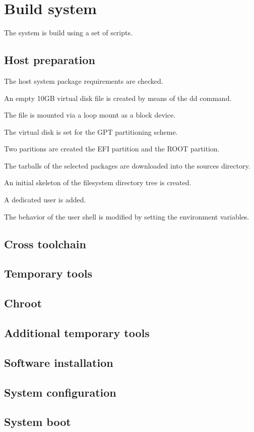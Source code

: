 \section{Build system}\label{Build system}

The system is build using a set of scripts.

\subsection{Host preparation}

The host system package requirements are checked.

An empty 10GB virtual disk file is created by means of the dd command.

The file is mounted via a loop mount as a block device.

The virtual disk is set for the GPT partitioning scheme.

Two paritions are created the EFI partition and the ROOT partition.

The tarballs of the selected packages are downloaded into the sources directory.

An initial skeleton of the filesystem directory tree is created.

A dedicated user is added.

The behavior of the user shell is modified by setting the environment variables.

\subsection{Cross toolchain}

\subsection{Temporary tools}

\subsection{Chroot}

\subsection{Additional temporary tools}

\subsection{Software installation}

\subsection{System configuration}

\subsection{System boot}

